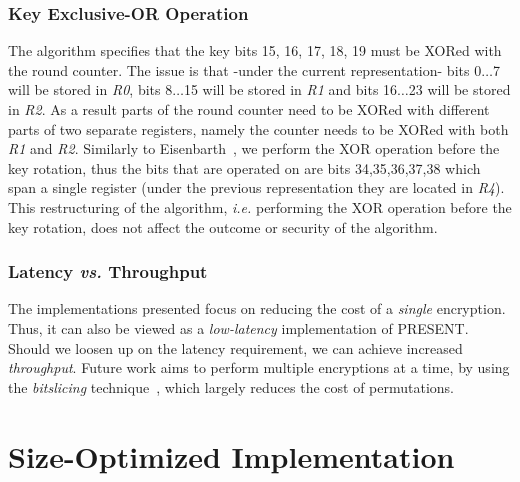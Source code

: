\documentclass[11pt]{llncs2e} %
\begin{document}
\subsubsection{Key Exclusive-OR Operation} \label{key_xor}
The algorithm specifies that the key bits 15, 16, 17, 18, 19 must be XORed with the round counter. The issue is that -under the current representation- bits 0$\dots$7 will be stored in \textit{R0}, bits 8$\dots$15 will be stored in \textit{R1} and bits 16$\dots$23 will be stored in \textit{R2}.
As a result parts of the round counter need to be XORed with different parts of two separate registers, namely the counter needs to be XORed with both \textit{R1} and \textit{R2}.
Similarly to Eisenbarth~\cite{eisenbarth2012compact}, we perform the XOR operation before the key rotation, thus the bits that are operated on are bits 34,35,36,37,38 which span a single register (under the previous representation they are located in \textit{R4}). This restructuring of the algorithm, \emph{i.e.} performing the XOR operation before the key rotation, does not affect the outcome or security of the algorithm. 

\subsubsection{Latency \emph{vs.} Throughput}
The implementations presented focus on reducing the cost of a \emph{single} encryption. Thus, it can also be viewed as a \emph{low-latency} implementation of PRESENT. Should we loosen up on the latency requirement, we can achieve increased \emph{throughput}. Future work aims to perform multiple encryptions at a time, by using the \emph{bitslicing} technique~\cite{bitsliced_des}, which largely reduces the cost of permutations.

\section{Size-Optimized Implementation}
\end{document}
